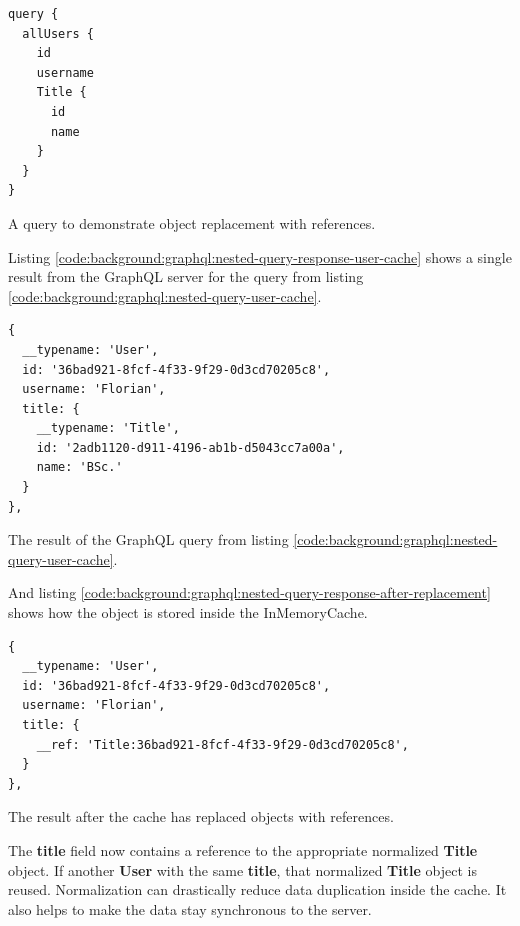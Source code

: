\ifshowListings
\begin{listing}[H]
    \begin{verbatim}
query {
  allUsers {
    id
    username
    Title {
      id
      name
    }
  }
}
    \end{verbatim}
    \caption{A query to demonstrate object replacement with references.}\label{code:background:graphql:nested-query-user-cache}
\end{listing}
\fi

Listing \ref{code:background:graphql:nested-query-response-user-cache} shows a single result from the GraphQL server for the query from listing \ref{code:background:graphql:nested-query-user-cache}.

\ifshowListings
\begin{listing}[H]
    \begin{verbatim}
{
  __typename: 'User',
  id: '36bad921-8fcf-4f33-9f29-0d3cd70205c8',
  username: 'Florian',
  title: {
    __typename: 'Title',
    id: '2adb1120-d911-4196-ab1b-d5043cc7a00a',
    name: 'BSc.'
  }
},
    \end{verbatim}
    \caption{The result of the GraphQL query from listing \ref{code:background:graphql:nested-query-user-cache}.} \label{code:background:graphql:nested-query-response-user-cache}
\end{listing}
\fi

And listing \ref{code:background:graphql:nested-query-response-after-replacement} shows how the object is stored inside the InMemoryCache.

\ifshowListings
\begin{listing}[H]
    \begin{verbatim}
{
  __typename: 'User',
  id: '36bad921-8fcf-4f33-9f29-0d3cd70205c8',
  username: 'Florian',
  title: {
    __ref: 'Title:36bad921-8fcf-4f33-9f29-0d3cd70205c8',
  }
},
    \end{verbatim}
    \caption{The result after the cache has replaced objects with references.}\label{code:background:graphql:nested-query-response-after-replacement}
\end{listing}
\fi

\noindent The \textbf{title} field now contains a reference to the appropriate normalized \textbf{Title} object. If another \textbf{User} with the same \textbf{title}, that normalized \textbf{Title} object is reused. Normalization can drastically reduce data duplication inside the cache. It also helps to make the data stay synchronous to the server.

